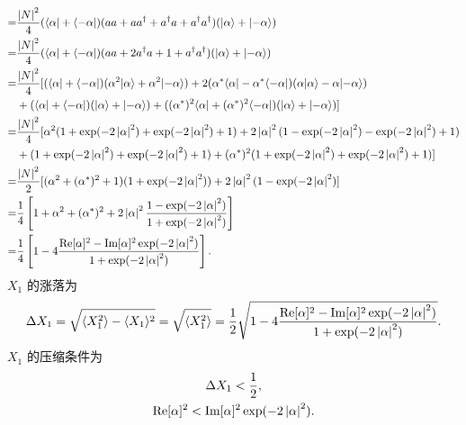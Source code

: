 \documentclass{assignment}
\begin{document}
\begin{sol}
\begin{itemize}
\begin{align}
            \notag=&\frac{\left\lvert N\right\rvert^2}{4}(\langle\alpha\rvert+\langle-\alpha\rvert)(aa+aa^{\dagger}+a^{\dagger}a+a^{\dagger}a^{\dagger})(\lvert\alpha\rangle+\lvert-\alpha\rangle)\\
            \notag=&\frac{\left\lvert N\right\rvert^2}{4}(\langle\alpha\rvert+\langle-\alpha\rvert)(aa+2a^{\dagger}a+1+a^{\dagger}a^{\dagger})(\lvert\alpha\rangle+\lvert-\alpha\rangle)\\
            \notag=&\frac{\left\lvert N\right\rvert^2}{4}[(\langle\alpha\rvert+\langle-\alpha\rvert)(\alpha^2\lvert\alpha\rangle+\alpha^2\lvert-\alpha\rangle)+2(\alpha^*\langle\alpha\rvert-\alpha^*\langle-\alpha\rvert)(\alpha\lvert\alpha\rangle-\alpha\lvert-\alpha\rangle)\\
            \notag&+(\langle\alpha\rvert+\langle-\alpha\rvert)(\lvert\alpha\rangle+\lvert-\alpha\rangle)+((\alpha^*)^2\langle\alpha\rvert+(\alpha^*)^2\langle-\alpha\rvert)(\lvert\alpha\rangle+\lvert-\alpha\rangle)]\\
            \notag=&\frac{\left\lvert N\right\rvert^2}{4}[\alpha^2(1+\exp(-2\left\lvert\alpha\right\rvert^2)+\exp(-2\left\lvert\alpha\right\rvert^2)+1)+2\left\lvert\alpha\right\rvert^2(1-\exp(-2\left\lvert\alpha\right\rvert^2)-\exp(-2\left\lvert\alpha\right\rvert^2)+1)\\
            \notag&+(1+\exp(-2\left\lvert\alpha\right\rvert^2)+\exp(-2\left\lvert\alpha\right\rvert^2)+1)+(\alpha^*)^2(1+\exp(-2\left\lvert\alpha\right\rvert^2)+\exp(-2\left\lvert\alpha\right\rvert^2)+1)]\\
            \notag=&\frac{\left\lvert N\right\rvert^2}{2}[(\alpha^2+(\alpha^*)^2+1)(1+\exp(-2\left\lvert\alpha\right\rvert^2))+2\left\lvert\alpha\right\rvert^2(1-\exp(-2\left\lvert\alpha\right\rvert^2)]\\
            \notag=&\frac{1}{4}\left[1+\alpha^2+(\alpha^*)^2+2\left\lvert\alpha\right\rvert^2\frac{1-\exp(-2\left\lvert\alpha\right\rvert^2)}{1+\exp(-2\left\lvert\alpha\right\rvert^2)}\right]\\
            =&\frac{1}{4}\left[1-4\frac{\operatorname{Re}[\alpha]^2-\operatorname{Im}[\alpha]^2\exp(-2\left\lvert\alpha\right\rvert^2)}{1+\exp(-2\left\lvert\alpha\right\rvert^2)}\right].
        \end{align}
        $X_1$ 的涨落为
        \begin{align}
            \Delta X_1=\sqrt{\langle X_1^2\rangle-\langle X_1\rangle^2}=\sqrt{\langle X_1^2\rangle}=\frac{1}{2}\sqrt{1-4\frac{\operatorname{Re}[\alpha]^2-\operatorname{Im}[\alpha]^2\exp(-2\left\lvert\alpha\right\rvert^2)}{1+\exp(-2\left\lvert\alpha\right\rvert^2)}}.
        \end{align}
        $X_1$ 的压缩条件为
        \begin{gather}
            \Delta X_1<\frac{1}{2},\\
            \operatorname{Re}[\alpha]^2<\operatorname{Im}[\alpha]^2\exp(-2\left\lvert\alpha\right\rvert^2).
        \end{gather}
    \end{itemize}
\end{sol}
\end{document}
